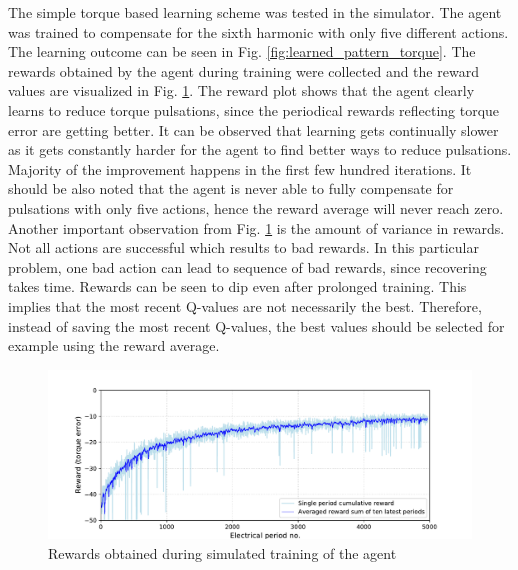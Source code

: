 The simple torque based learning scheme was tested in the simulator. The agent was trained to compensate for the sixth harmonic with only five different actions. The learning outcome can be seen in Fig. \ref{fig:learned_pattern_torque}. The rewards obtained by the agent during training were collected and the reward values are visualized in Fig. \ref{fig:qlr_torque_reward}. The reward plot shows that the agent clearly learns to reduce torque pulsations, since the periodical rewards reflecting torque error are getting better. It can be observed that learning gets continually slower as it gets constantly harder for the agent to find better ways to reduce pulsations. Majority of the improvement happens in the first few hundred iterations. It should be also noted that the agent is never able to fully compensate for pulsations with only five actions, hence the reward average will never reach zero. Another important observation from Fig. \ref{fig:qlr_torque_reward} is the amount of variance in rewards. Not all actions are successful which results to bad rewards. In this particular problem, one bad action can lead to sequence of bad rewards, since recovering takes time. Rewards can be seen to dip even after prolonged training. This implies that the most recent Q-values are not necessarily the best. Therefore, instead of saving the most recent Q-values, the best values should be selected for example using the reward average.
\begin{figure}[tb] 
    \centering
    \includegraphics[width=\textwidth]{images/torque-reward-history.pdf}
    \caption{Rewards obtained during simulated training of the agent}
    \label{fig:qlr_torque_reward}
\end{figure}

